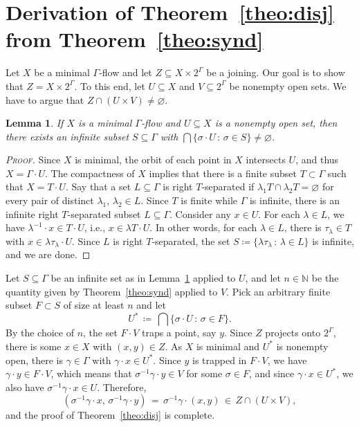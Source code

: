 \documentclass[11pt, reqno, psamsfonts]{amsart}
\theoremstyle{bfnote}
\newtheorem{lemma}[equation]{Lemma}
\theoremstyle{claim}
\theoremstyle{definition}
\theoremstyle{remark}
\newcommand{\0}{\varnothing}
\newcommand{\set}[1]{\{#1\}}
\newcommand{\N}{{\mathbb{N}}}
\renewcommand{\G}{\Gamma}
\newcommand{\defeq}{\coloneqq}
\newcommand{\emphd}[1]{{\fontseries{b}\selectfont\textsf{#1}}}
\newenvironment{scproof}[1][Proof]{\begin{proof}[\textsc{#1}]}{\end{proof}}
\numberwithin{equation}{section}
\begin{document}
	\section{Derivation of Theorem~\ref{theo:disj} from Theorem~\ref{theo:synd}}\label{sec:reduction}
	
	Let $X$ be a minimal $\G$-flow and let $Z \subseteq X \times 2^\G$ be a joining. Our goal is to show that $Z = X \times 2^\G$. To this end, let $U \subseteq X$ and $V \subseteq 2^\G$ be nonempty open sets. We have to argue that $Z \cap (U \times V) \neq \0$.
	
	\begin{lemma}\label{lemma:rec}
		If $X$ is a minimal $\G$-flow and $U \subseteq X$ is a nonempty open set, then there exists an infinite subset $S \subseteq \G$ with $\bigcap \set{\sigma \cdot U \,:\, \sigma \in S} \neq \0$.
	\end{lemma}
	\begin{scproof}
		Since $X$ is minimal, the orbit of each point in $X$ intersects $U$, and thus $X = \G \cdot U$. The compactness of $X$ implies that there is a finite subset $T \subset \G$ such that $X = T \cdot U$. Say that a set $L \subseteq \G$ is \emphd{right $T$-separated} if $\lambda_1T \cap \lambda_2T = \0$ for every pair of distinct $\lambda_1$, $\lambda_2 \in L$. Since $T$ is finite while $\G$ is infinite, there is an infinite right $T$-separated subset $L \subseteq \G$. Consider any $x \in U$. For each $\lambda \in L$, we have $\lambda^{-1} \cdot x \in T \cdot U$, i.e., $x \in \lambda T \cdot U$. In other words, for each $\lambda \in L$, there is $\tau_\lambda \in T$ with $x \in \lambda \tau_\lambda \cdot U$. Since $L$ is right $T$-separated, the set $S \defeq \set{\lambda \tau_\lambda \,:\, \lambda \in L}$ is infinite, and we are done. 
	\end{scproof}
	
	Let $S \subseteq \G$ be an infinite set as in Lemma~\ref{lemma:rec} applied to $U$, and let $n \in \N$ be the quantity given by Theorem~\ref{theo:synd} applied to $V$. Pick an arbitrary finite subset $F \subset S$ of size at least $n$ and let
	\[
	U^\ast \,\defeq\, \bigcap \set{\sigma \cdot U \,:\, \sigma \in F}.
	\]
	By the choice of $n$, the set $F \cdot V$ traps a point, say $y$. Since $Z$ projects onto $2^\G$, there is some $x \in X$ with $(x,y) \in Z$. As $X$ is minimal and $U^\ast$ is nonempty open, there is $\gamma \in \G$ with $\gamma \cdot x \in U^\ast$. Since $y$ is trapped in $F \cdot V$, we have $\gamma \cdot y \in F \cdot V$, which means that $\sigma^{-1}\gamma \cdot y \in V$ for some $\sigma \in F$, and since $\gamma \cdot x \in U^\ast$, we also have $\sigma^{-1}\gamma \cdot x \in U$. Therefore,
	\[
	(\sigma^{-1}\gamma \cdot x, \, \sigma^{-1}\gamma \cdot y) \,=\, \sigma^{-1}\gamma \cdot (x,y) \,\in\, Z \cap (U \times V),
	\]
	and the proof of Theorem~\ref{theo:disj} is complete.
	
\end{document}
